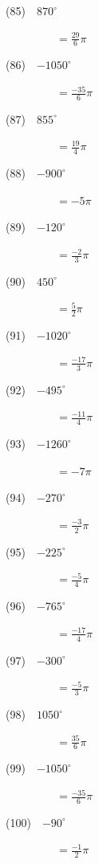 \documentclass[a4j,twocolumn,10pt,fleqn]{jarticle}
\begin{document}
(85)~~$870^\circ$

~~~~~~~~~$=\frac{29}{6}\pi$

(86)~~$-1050^\circ$

~~~~~~~~~$=\frac{-35}{6}\pi$

(87)~~$855^\circ$

~~~~~~~~~$=\frac{19}{4}\pi$

(88)~~$-900^\circ$

~~~~~~~~~$=-5\pi$

(89)~~$-120^\circ$

~~~~~~~~~$=\frac{-2}{3}\pi$

(90)~~$450^\circ$

~~~~~~~~~$=\frac{5}{2}\pi$

(91)~~$-1020^\circ$

~~~~~~~~~$=\frac{-17}{3}\pi$

(92)~~$-495^\circ$

~~~~~~~~~$=\frac{-11}{4}\pi$

(93)~~$-1260^\circ$

~~~~~~~~~$=-7\pi$

(94)~~$-270^\circ$

~~~~~~~~~$=\frac{-3}{2}\pi$

(95)~~$-225^\circ$

~~~~~~~~~$=\frac{-5}{4}\pi$

(96)~~$-765^\circ$

~~~~~~~~~$=\frac{-17}{4}\pi$

(97)~~$-300^\circ$

~~~~~~~~~$=\frac{-5}{3}\pi$

(98)~~$1050^\circ$

~~~~~~~~~$=\frac{35}{6}\pi$

(99)~~$-1050^\circ$

~~~~~~~~~$=\frac{-35}{6}\pi$

(100)~~$-90^\circ$

~~~~~~~~~$=\frac{-1}{2}\pi$
\end{document}

